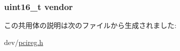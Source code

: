 \label{unionPCIConfig_abb997da89ef1dab1298bd1a28ba3617a}
\hypertarget{unionPCIConfig_a593296dde780579566307c0f86863463}{
\subsubsection[{vendor}]{\setlength{\rightskip}{0pt plus 5cm}uint16\_\-t {\bf vendor}}}
\label{unionPCIConfig_a593296dde780579566307c0f86863463}


この共用体の説明は次のファイルから生成されました:\begin{DoxyCompactItemize}
\item 
dev/\hyperlink{pcireg_8h}{pcireg.h}\end{DoxyCompactItemize}
